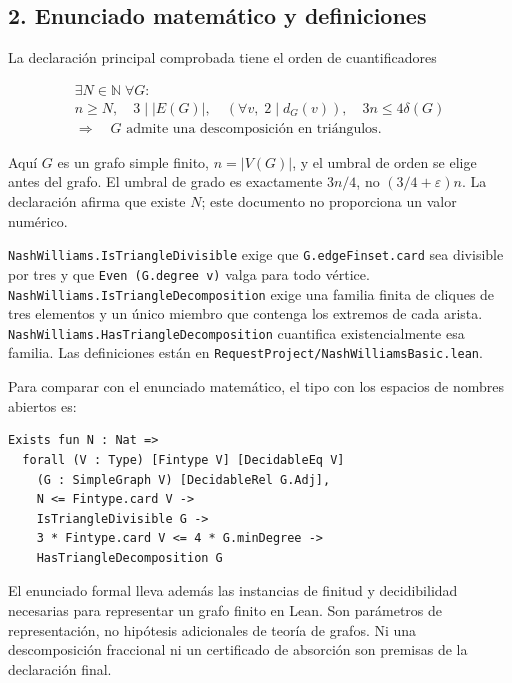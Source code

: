 \documentclass[spanish,11pt,a4paper]{article}
\begin{document}
\subsection{2. Enunciado matemático y definiciones}\label{enunciado-matemuxe1tico-y-definiciones}

La declaración principal comprobada tiene el orden de cuantificadores

\[\begin{gathered}
\exists N\in\mathbb N\;\forall G:\\
n\ge N,\quad 3\mid |E(G)|,\quad
(\forall v,\;2\mid d_G(v)),\quad 3n\le4\delta(G)
\\
\Longrightarrow\quad G\text{ admite una descomposición en triángulos}.
\end{gathered}\]

Aquí \(G\) es un grafo simple finito, \(n=|V(G)|\), y el umbral de orden se elige antes del grafo. El umbral de grado es exactamente \(3n/4\), no \((3/4+\varepsilon)n\). La declaración afirma que existe \(N\); este documento no proporciona un valor numérico.

\texttt{Nash\allowbreak{}Williams.\allowbreak{}Is\allowbreak{}Triangle\allowbreak{}Divisible} exige que \texttt{G.\allowbreak{}edge\allowbreak{}Finset.\allowbreak{}card} sea divisible por tres y que \texttt{Even\ (G.\allowbreak{}degree\ v)} valga para todo vértice. \texttt{Nash\allowbreak{}Williams.\allowbreak{}Is\allowbreak{}Triangle\allowbreak{}Decomposition} exige una familia finita de cliques de tres elementos y un único miembro que contenga los extremos de cada arista. \texttt{Nash\allowbreak{}Williams.\allowbreak{}Has\allowbreak{}Triangle\allowbreak{}Decomposition} cuantifica existencialmente esa familia. Las definiciones están en \texttt{Request\allowbreak{}Project/\allowbreak{}Nash\allowbreak{}Williams\allowbreak{}Basic.\allowbreak{}lean}.

Para comparar con el enunciado matemático, el tipo con los espacios de nombres abiertos es:

\begin{verbatim}
Exists fun N : Nat =>
  forall (V : Type) [Fintype V] [DecidableEq V]
    (G : SimpleGraph V) [DecidableRel G.Adj],
    N <= Fintype.card V ->
    IsTriangleDivisible G ->
    3 * Fintype.card V <= 4 * G.minDegree ->
    HasTriangleDecomposition G
\end{verbatim}

El enunciado formal lleva además las instancias de finitud y decidibilidad necesarias para representar un grafo finito en Lean. Son parámetros de representación, no hipótesis adicionales de teoría de grafos. Ni una descomposición fraccional ni un certificado de absorción son premisas de la declaración final.
\end{document}
